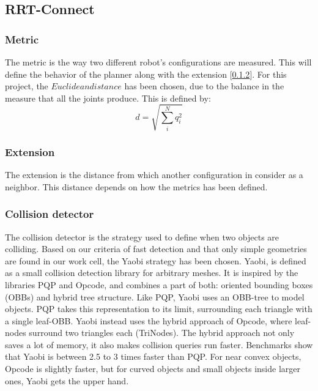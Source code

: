 	\subsection{RRT-Connect} %
	\label{sub:rrt_connect_implementation}
	\subsubsection{Metric} %
	\label{sub:metric}
	The metric is the way two different robot's configurations are measured. This will define the behavior of the planner along with the extension [\ref{sub:extension}]. For this project, the $Euclidean distance$ has been chosen, due to the balance in the measure that all the joints produce. This is defined by:
	\begin{equation}
		d=\sqrt{\sum_i^N q_i^2}
	\end{equation}

	\subsubsection{Extension} %
	\label{sub:extension}
	The extension is the distance from which another configuration in consider as a neighbor. This distance depends on how the metrics has been defined.

	\subsubsection{Collision detector} %
	\label{sub:collision_detector}
	The collision detector is the strategy used to define when two objects are colliding. Based on our criteria of fast detection and that only simple geometries are found in our work cell, the Yaobi strategy \cite{Yaobi} has been chosen. Yaobi, is defined as a small collision detection library for arbitrary meshes. It is inspired by the libraries PQP and Opcode, and combines a part of both: oriented bounding boxes (OBBs) and hybrid tree structure. Like PQP, Yaobi uses an OBB-tree to model objects. PQP takes this representation to its limit, surrounding each triangle with a single leaf-OBB. Yaobi instead uses the hybrid approach of Opcode, where leaf-nodes surround two triangles each (TriNodes). The hybrid approach not only saves a lot of memory, it also makes collision queries run faster. Benchmarks show that Yaobi is between 2.5 to 3 times faster than PQP. For near convex objects, Opcode is slightly faster, but for curved objects and small objects inside larger ones, Yaobi gets the upper hand.
